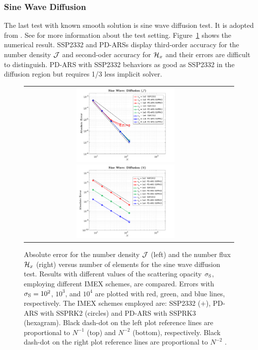 \subsubsection{Sine Wave Diffusion}
The last test with known smooth solution is sine wave diffusion test.
It is adopted from \cite{radice_etal_2013}.
See \cite{chu_etal_2018} for more information about the test setting.
Figure~\ref{fig:SineWaveDiffusionJ} shows the numerical result.
SSP2332 and PD-ARSs display third-order accuracy for the number density $\mathcal{J}$ and second-oder accuracy for $\mathcal{H}_{x}$ and their errors are difficult to distinguish.
PD-ARS with SSP2332 behaviors as good as SSP2332 in the diffusion region but requires 1/3 less implicit solver.
\begin{figure}[h]
  \centering
  \begin{tabular}{cc}
    \includegraphics[width=0.5\textwidth]{figures/SineWaveDiffusionJ}
    \includegraphics[width=0.5\textwidth]{figures/SineWaveDiffusionH}
  \end{tabular}
   \caption{Absolute error for the number density $\mathcal{J}$ (left) and the number flux $\mathcal{H}_{x}$ (right) versus number of elements for the sine wave diffusion test.  Results with different values of the scattering opacity $\sigma_{{\rm S}}$, employing different IMEX schemes, are compared.  Errors with $\sigma_{{\rm S}}=10^{2}$, $10^{3}$, and $10^{4}$ are plotted with red, green, and blue lines, respectively.  The IMEX schemes employed are:  SSP2332 ($+$), PD-ARS with SSPRK2 (circles) and PD-ARS with SSPRK3 (hexagram). Black dash-dot on the left plot reference lines are proportional to $N^{-1}$ (top) and $N^{-2}$ (bottom), respectively. Black dash-dot on the right plot reference lines are proportional to $N^{-2}$ .}
   \label{fig:SineWaveDiffusionJ}
\end{figure}

